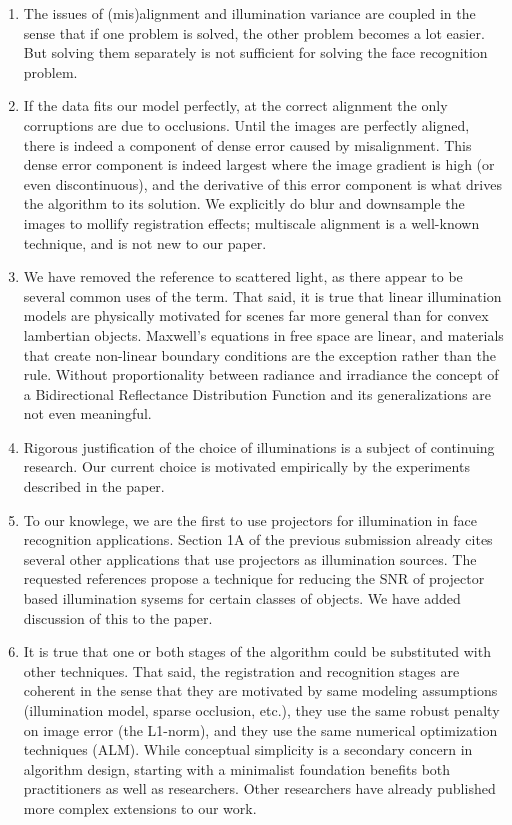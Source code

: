 \documentclass[11pt]{article}
\begin{document}
\begin{enumerate}
\item The issues of (mis)alignment and illumination variance are coupled in the
sense that if one problem is solved, the other problem becomes a lot easier. But solving them
separately is not sufficient for solving the face recognition problem. 

\item If the data fits our model perfectly, at the correct alignment the only
corruptions are due to occlusions.  Until the images are perfectly aligned,
there is indeed a component of dense error caused by misalignment.  This dense
error component is indeed largest where the image gradient is high (or even
discontinuous), and the derivative of this error component is what drives the
algorithm to its solution.  We explicitly do blur and downsample the images to
mollify registration effects; multiscale alignment is a well-known technique,
and is not new to our paper.  

\item We have removed the reference to scattered light, as there appear to
be several common uses of the term.  That said, it is true that linear illumination
models are physically motivated for scenes far more general than for convex 
lambertian objects.  Maxwell's equations in free space are linear, and materials
that create non-linear boundary conditions are the exception
rather than the rule.  Without proportionality between radiance and irradiance 
the concept of a Bidirectional Reflectance Distribution Function and its
generalizations are not even meaningful. 

\item Rigorous justification of the choice of illuminations is a subject of 
continuing research.  Our current choice is motivated empirically by the
experiments described in the paper. 

\item To our knowlege, we are the first to use projectors for illumination in
face recognition applications.  Section 1A of the previous submission already
cites several other applications that use projectors as illumination sources.
The requested references propose a technique for reducing the SNR of projector
based illumination sysems for certain classes of objects.  We have added
discussion of this to the paper.

\item  It is true that one or both stages of the algorithm could be substituted
with other techniques.  That said, the registration and recognition stages are
coherent in the sense that they are motivated by same modeling assumptions
(illumination model, sparse occlusion, etc.), they use the same robust penalty
on image error (the L1-norm), and they use the same numerical optimization
techniques (ALM).  While conceptual simplicity is a secondary concern in
algorithm design, starting with a minimalist foundation benefits both
practitioners as well as researchers.  Other researchers have already published
more complex extensions to our work. 


\end{enumerate}
\end{document}
